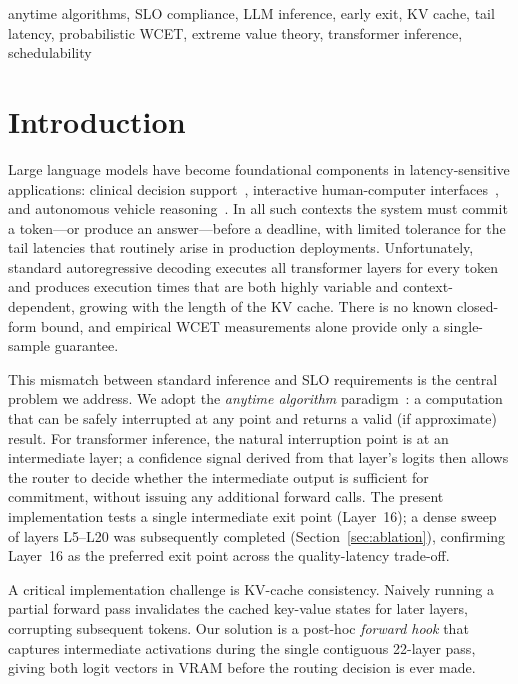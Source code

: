 \documentclass[conference]{IEEEtran}
\begin{document}
\begin{IEEEkeywords}
anytime algorithms, SLO compliance, LLM inference,
early exit, KV cache, tail latency, probabilistic WCET, extreme value theory,
transformer inference, schedulability
\end{IEEEkeywords}

\section{Introduction}

Large language models have become foundational components in
latency-sensitive applications: clinical decision support~\cite{singhal2023large},
interactive human-computer interfaces~\cite{ouyang2022training}, and
autonomous vehicle reasoning~\cite{wen2023dilu}.
In all such contexts the system must commit a token---or produce an
answer---before a deadline, with limited tolerance for the tail latencies
that routinely arise in production deployments.
Unfortunately, standard autoregressive decoding executes all transformer
layers for every token and produces execution times that are both highly
variable and context-dependent, growing with the length of the KV cache.
There is no known closed-form bound, and empirical WCET measurements
alone provide only a single-sample guarantee.

This mismatch between standard inference and SLO requirements is the
central problem we address.
We adopt the \emph{anytime algorithm} paradigm~\cite{boddy1994deliberation,
zilberstein1996using}: a computation that can be safely interrupted at
any point and returns a valid (if approximate) result.
For transformer inference, the natural interruption point is at an
intermediate layer; a confidence signal derived from that layer's logits
then allows the router to decide whether the intermediate output is
sufficient for commitment, without issuing any additional forward calls.
The present implementation tests a single intermediate exit point (Layer~16);
a dense sweep of layers L5--L20 was subsequently completed
(Section~\ref{sec:ablation}), confirming Layer~16 as the preferred exit
point across the quality-latency trade-off.

A critical implementation challenge is KV-cache consistency.
Naively running a partial forward pass invalidates the cached key-value
states for later layers, corrupting subsequent tokens.
Our solution is a post-hoc \emph{forward hook} that captures intermediate
activations during the single contiguous 22-layer pass, giving both logit
vectors in VRAM before the routing decision is ever made.
\end{document}
